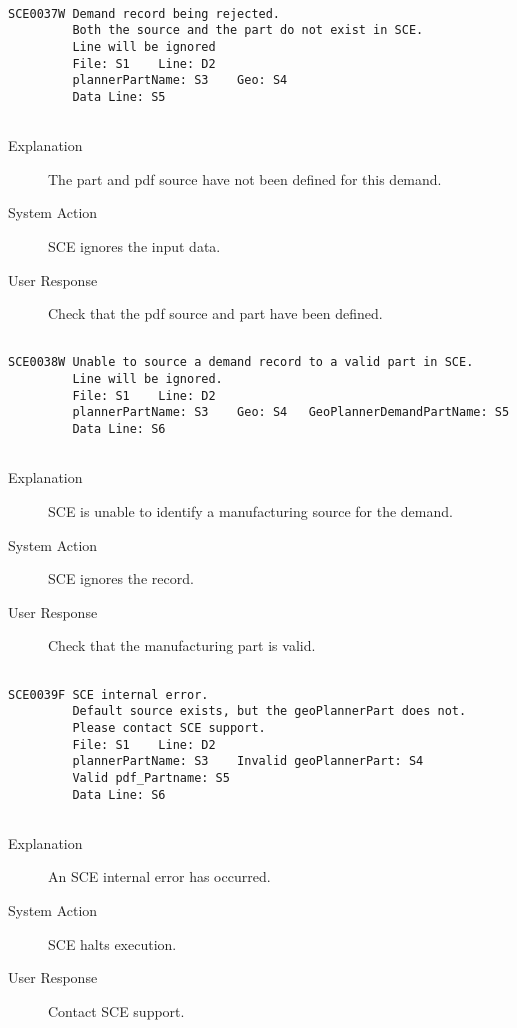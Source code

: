 \hrulefill
\begin{verbatim}

SCE0037W Demand record being rejected.
         Both the source and the part do not exist in SCE.
         Line will be ignored
         File: S1    Line: D2
         plannerPartName: S3    Geo: S4
         Data Line: S5
         
\end{verbatim}
\begin{description}
\item[Explanation]  The part and pdf source have not been defined for this demand.

\item[System Action]  SCE ignores the input data.

\item[User Response]  Check that the pdf source and part have been defined.
\end{description}
\hrulefill
\begin{verbatim}

SCE0038W Unable to source a demand record to a valid part in SCE.
         Line will be ignored.
         File: S1    Line: D2
         plannerPartName: S3    Geo: S4   GeoPlannerDemandPartName: S5
         Data Line: S6
         
\end{verbatim}
\begin{description}
\item[Explanation]  SCE is unable to identify a manufacturing source for the demand.

\item[System Action]  SCE ignores the record.

\item[User Response]  Check that the manufacturing part is valid.
\end{description}
\hrulefill
\begin{verbatim}

SCE0039F SCE internal error.
         Default source exists, but the geoPlannerPart does not.
         Please contact SCE support.
         File: S1    Line: D2
         plannerPartName: S3    Invalid geoPlannerPart: S4
         Valid pdf_Partname: S5
         Data Line: S6
         
\end{verbatim}
\begin{description}
\item[Explanation]  An SCE internal error has occurred.

\item[System Action]  SCE halts execution.

\item[User Response]  Contact SCE support.
\end{description}
